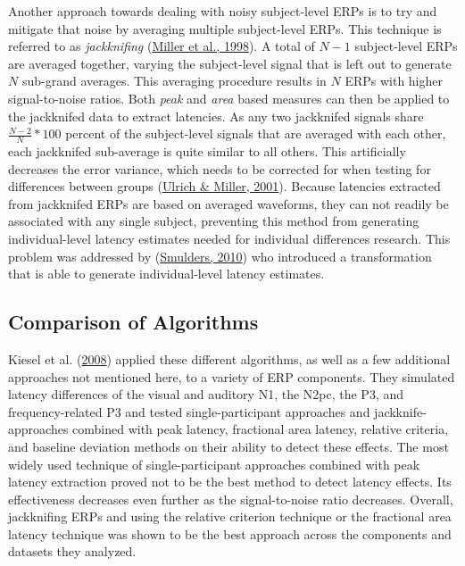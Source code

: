 \documentclass[
  man]{apa7}
\begin{document}
Another approach towards dealing with noisy subject-level ERPs is to try and mitigate that noise by averaging multiple subject-level ERPs. This technique is referred to as \emph{jackknifing} (\protect\hyperlink{ref-miller1998jackknife}{Miller et al., 1998}). A total of \(N - 1\) subject-level ERPs are averaged together, varying the subject-level signal that is left out to generate \(N\) sub-grand averages. This averaging procedure results in \(N\) ERPs with higher signal-to-noise ratios. Both \emph{peak} and \emph{area} based measures can then be applied to the jackknifed data to extract latencies. As any two jackknifed signals share \(\frac{N-2}{N} * 100\) percent of the subject-level signals that are averaged with each other, each jackknifed sub-average is quite similar to all others. This artificially decreases the error variance, which needs to be corrected for when testing for differences between groups (\protect\hyperlink{ref-ulrich2001using}{Ulrich \& Miller, 2001}). Because latencies extracted from jackknifed ERPs are based on averaged waveforms, they can not readily be associated with any single subject, preventing this method from generating individual-level latency estimates needed for individual differences research. This problem was addressed by (\protect\hyperlink{ref-smulders2010simplifying}{Smulders, 2010}) who introduced a transformation that is able to generate individual-level latency estimates.

\hypertarget{comparison-of-algorithms}{%
\subsection{Comparison of Algorithms}\label{comparison-of-algorithms}}

Kiesel et al. (\protect\hyperlink{ref-kiesel2008measurement}{2008}) applied these different algorithms, as well as a few additional approaches not mentioned here, to a variety of ERP components. They simulated latency differences of the visual and auditory N1, the N2pc, the P3, and frequency-related P3 and tested single-participant approaches and jackknife-approaches combined with peak latency, fractional area latency, relative criteria, and baseline deviation methods on their ability to detect these effects. The most widely used technique of single-participant approaches combined with peak latency extraction proved not to be the best method to detect latency effects. Its effectiveness decreases even further as the signal-to-noise ratio decreases. Overall, jackknifing ERPs and using the relative criterion technique or the fractional area latency technique was shown to be the best approach across the components and datasets they analyzed.
\end{document}

